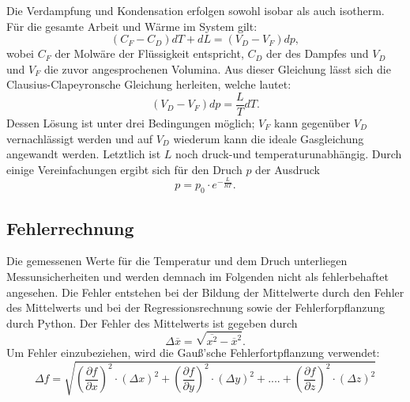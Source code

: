 Die Verdampfung und Kondensation erfolgen sowohl isobar als auch isotherm.
Für die gesamte Arbeit und Wärme im System gilt:
\begin{equation}
    (C_F-C_D)dT + dL = (V_D-V_F)dp,
\end{equation}
wobei $C_F$ der Molwäre der Flüssigkeit entspricht, $C_D$ der des Dampfes und 
$V_D$ und $V_F$ die zuvor angesprochenen Volumina. Aus dieser Gleichung lässt 
sich die Clausius-Clapeyronsche Gleichung herleiten, welche lautet:
\begin{equation}
    \label{eqn:2}
    (V_D-V_F)dp = \frac{L}{T}dT.
\end{equation}
Dessen Lösung ist unter drei Bedingungen möglich; $V_F$ kann gegenüber $V_D$
vernachlässigt werden und auf $V_D$ wiederum kann die ideale Gasgleichung
angewandt werden. Letztlich ist $L$ noch druck-und temperaturunabhängig.
Durch einige Vereinfachungen ergibt sich für den Druch $p$ der Ausdruck
\begin{equation}
    p = p_0 \cdot e^{-\frac{L}{RT}}.
\end{equation}

\subsection{Fehlerrechnung}
Die gemessenen Werte für die Temperatur und dem Druch unterliegen 
Messunsicherheiten und werden demnach im Folgenden nicht als fehlerbehaftet 
angesehen. Die Fehler entstehen bei der Bildung der Mittelwerte durch den 
Fehler des Mittelwerts und bei der Regressionsrechnung sowie der Fehlerforpflanzung 
durch Python. Der Fehler des Mittelwerts ist gegeben durch 
\begin{equation}
    \Delta \overline{x} = \sqrt{\overline{x^2} - \overline{x}^2}.
\end{equation}
Um Fehler einzubeziehen, wird die Gauß'sche Fehlerfortpflanzung verwendet:
\begin{equation}
    \Delta f = \sqrt{\left(\frac{\partial f}{\partial x}\right)^2 \cdot \left(\Delta x\right)^2 + \left(\frac{\partial f}{\partial y}\right)^2 \cdot \left(\Delta y\right)^2 + .... + \left(\frac{\partial f}{\partial z}\right)^2 \cdot \left(\Delta z\right)^2}
\end{equation}